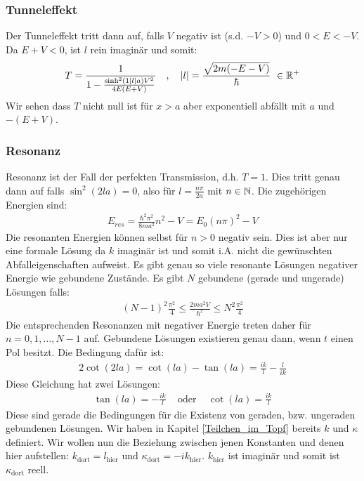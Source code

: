 \subsubsection{Tunneleffekt}

Der Tunneleffekt tritt dann auf, falls $V$ negativ ist (s.d. $-V > 0$) und
$0 < E < -V$. Da $E+V < 0$, ist $l$ rein imaginär und somit:
\begin{align*}
    T = \frac{1}{1 - \frac{\sinh^2 \left( 1 \left\vert l \right\vert a \right) V^2}{4 E (E+V)}}
    \hspace{10pt} , \hspace{10pt}
    \left\vert l \right\vert = \frac{\sqrt{2m(-E-V)}}{\hbar} \ \in \mathbb{R}^+
\end{align*}
Wir sehen dass $T$ nicht null ist für $x>a$ aber exponentiell abfällt mit
$a$ und $-(E+V)$.

\subsubsection{Resonanz}

Resonanz ist der Fall der perfekten Transmission, d.h. $T=1$. Dies tritt genau
dann auf falls $\sin^2(2 l a) = 0$, also für $l=\frac{n \pi}{2 a}$ mit $n \in \mathbb{N}$.
Die zugehörigen Energien sind:
\begin{align*}
    E_{res} = \frac{\hbar^2 \pi^2}{8 m a^2} n^2 - V = E_0 (n \pi)^2 - V
\end{align*}
Die resonanten Energien können selbst für $n>0$ negativ sein. Dies ist aber
nur eine formale Lösung da $k$ imaginär ist und somit i.A. nicht die gewünschten
Abfalleigenschaften aufweist. Es gibt genau so viele resonante Lösungen negativer
Energie wie gebundene Zustände. Es gibt $N$ gebundene (gerade und ungerade)
Lösungen falls:
\begin{align*}
    (N-1)^2 \frac{\pi^2}{4} \leq \frac{2 m a^2 V}{\hbar^2} \leq N^2 \frac{\pi^2}{4}
\end{align*}
Die entsprechenden Resonanzen mit negativer Energie treten daher für $n=0,1,\dots,N-1$
auf. Gebundene Lösungen existieren genau dann, wenn $t$ einen Pol besitzt. Die
Bedingung dafür ist:
\begin{align*}
    2 \cot(2 l a) = \cot(l a) - \tan(l a) = \frac{i k}{l} - \frac{l}{i k}
\end{align*}
Diese Gleichung hat zwei Lösungen:
\begin{align*}
    \tan(l a) = - \frac{i k}{l}
    \hspace{10pt} \text{ oder } \hspace{10pt}
    \cot(l a) = \frac{i k}{l}
\end{align*}
Diese sind gerade die Bedingungen für die Existenz von geraden, bzw. ungeraden
gebundenen Lösungen. Wir haben in Kapitel \ref{Teilchen_im_Topf}
bereits $k$ und $\kappa$ definiert. Wir wollen nun die Beziehung zwischen jenen
Konstanten und denen hier aufstellen: $k_{\text{dort}} = l_{\text{hier}}$ und
$\kappa_{\text{dort}} = -i k_{\text{hier}}$. $k_{\text{hier}}$ ist imaginär und somit
ist $\kappa_{\text{dort}}$ reell.

